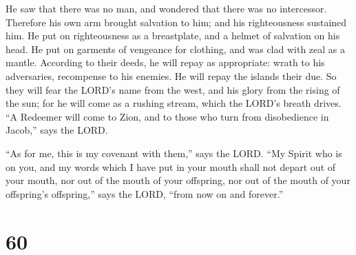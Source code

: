  He saw that there was no man, and wondered that there
was no intercessor. Therefore his own arm brought salvation to him; and
his righteousness sustained him.  He put on righteousness
as a breastplate, and a helmet of salvation on his head. He put on
garments of vengeance for clothing, and was clad with zeal as a mantle.
 According to their deeds, he will repay as appropriate:
wrath to his adversaries, recompense to his enemies. He will repay the
islands their due.  So they will fear the LORD's name
from the west, and his glory from the rising of the sun; for he will
come as a rushing stream, which the LORD's breath drives.
 ``A Redeemer will come to Zion, and to those who turn
from disobedience in Jacob,'' says the LORD.

 ``As for me, this is my covenant with them,'' says the
LORD. ``My Spirit who is on you, and my words which I have put in your
mouth shall not depart out of your mouth, nor out of the mouth of your
offspring, nor out of the mouth of your offspring's offspring,'' says
the LORD, ``from now on and forever.''

\hypertarget{section-57}{%
\section{60}\label{section-57}}

